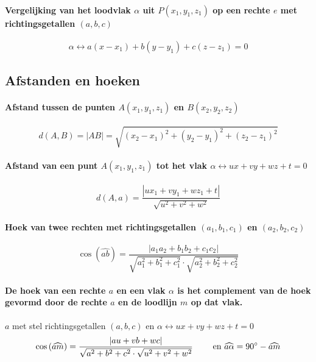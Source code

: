 \paragraph{Vergelijking van het loodvlak $\alpha$ uit $P\left(x_1,y_1,z_1\right)$ op een rechte $e$ met richtingsgetallen $\left(a,b,c\right)$}
\label{sec:LoodvlakRechte}
  \[
    \alpha \leftrightarrow a\left(x-x_1\right)+b\left(y-y_1\right)+c\left(z-z_1\right)=0
  \]


\subsection{Afstanden en hoeken}
\label{sec:AfstandenEnHoeken}
      
\paragraph{Afstand tussen de punten $A\left(x_1,y_1,z_1\right)$ en $B\left(x_2,y_2,z_2\right)$}
\label{sec:AfstandPunten}
   \[
    d\left(A,B\right) = |AB| = \sqrt{\left(x_2-x_1\right)^2+\left(y_2-y_1\right)^2+\left(z_2-z_1\right)^2}
   \]
 
\paragraph{Afstand van een punt $A\left(x_1,y_1,z_1\right)$ tot het vlak $\alpha \leftrightarrow ux + vy + wz + t = 0$}
\label{sec:AfstandPuntVlak}
    \[
      d\left(A,a\right) = \frac{\left| ux_1 + vy_1 + wz_1 + t\right|}{\sqrt{u^2 + v^2 + w^2}}
    \]
   
\paragraph{Hoek van twee rechten met richtingsgetallen $\left(a_1,b_1,c_1\right)$ en $\left(a_2,b_2,c_2\right)$}
\label{sec:HoekRechten}
    \[
      \cos\left(\widehat{ab} \right) = \frac {\left| a_1 a_2 + b_1 b_2 + c_1 c_2\right|}%
                                             {\sqrt{a_1^2 + b_1^2 + c_1^2} \cdot \sqrt{a_2^2 + b_2^2 + c_2^2}}
    \]

\paragraph{De hoek van een rechte $a$ en een vlak $\alpha$ is het complement van de hoek gevormd door de rechte $a$ en de loodlijn $m$ op dat vlak.}
\label{sec:HoekRechteVlak}
    $a$ met stel richtingsgetallen $\left(a,b,c\right)$ en $\alpha \leftrightarrow ux + vy + wz + t = 0$
    \[
      \cos\left(\widehat{am} \right) = \frac {\left| au + vb + wc\right|}%
                                             {\sqrt{a^2 + b^2 + c^2} \cdot \sqrt{u^2 + v^2 + w^2}}
                                             \qquad \textrm{ en } \widehat{a \alpha} = 90 \degree - \widehat{am}
    \]
    
